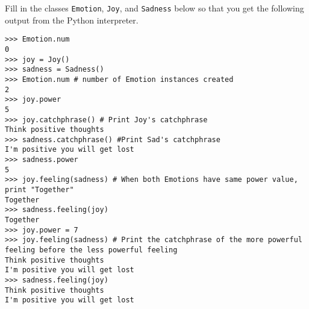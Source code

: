 \question
Fill in the classes \texttt{Emotion}, \texttt{Joy}, and \texttt{Sadness} below so that you get the following output from the Python interpreter.

\begin{blocksection}
\begin{lstlisting}
>>> Emotion.num
0
>>> joy = Joy()
>>> sadness = Sadness()
>>> Emotion.num # number of Emotion instances created
2
>>> joy.power
5
>>> joy.catchphrase() # Print Joy's catchphrase
Think positive thoughts
>>> sadness.catchphrase() #Print Sad's catchphrase
I'm positive you will get lost
>>> sadness.power
5
>>> joy.feeling(sadness) # When both Emotions have same power value, print "Together"
Together
>>> sadness.feeling(joy)
Together
>>> joy.power = 7
>>> joy.feeling(sadness) # Print the catchphrase of the more powerful feeling before the less powerful feeling
Think positive thoughts
I'm positive you will get lost
>>> sadness.feeling(joy)
Think positive thoughts 
I'm positive you will get lost
\end{lstlisting}
\newpage
\end{blocksection}

